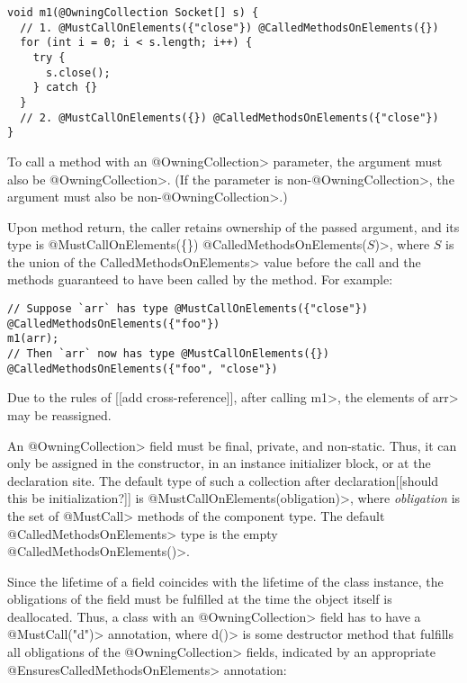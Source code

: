 \begin{verbatim}
void m1(@OwningCollection Socket[] s) {
  // 1. @MustCallOnElements({"close"}) @CalledMethodsOnElements({})
  for (int i = 0; i < s.length; i++) {
    try {
      s.close();
    } catch {}
  }
  // 2. @MustCallOnElements({}) @CalledMethodsOnElements({"close"})
}
\end{verbatim}

To call a method with an \<@OwningCollection> parameter, the argument must
also be \<@OwningCollection>.
(If the parameter is non-\<@OwningCollection>, the argument must also be non-\<@OwningCollection>.)

Upon method return, the caller retains ownership of the passed argument,
and its type is
\<@MustCallOnElements(\{\}) @CalledMethodsOnElements($S$)>, where $S$ is the
union of
the \<CalledMethodsOnElements> value before the call and the methods guaranteed
to have been called by the method.  For example:

\begin{verbatim}
// Suppose `arr` has type @MustCallOnElements({"close"}) @CalledMethodsOnElements({"foo"})
m1(arr);
// Then `arr` now has type @MustCallOnElements({}) @CalledMethodsOnElements({"foo", "close"})
\end{verbatim}

Due to the rules of [[add cross-reference]], after calling \<m1>, the elements of \<arr> may be reassigned.



An \<@OwningCollection> field must be final, private, and non-static. Thus, it
can only be assigned in the constructor, in an instance initializer block, or at the declaration site.
The default type of such a collection after declaration[[should this be initialization?]] is \<@MustCallOnElements(obligation)>, where \textit{obligation} is the set of \<@MustCall> methods of the component type. The default \<@CalledMethodsOnElements> type is the empty \<@CalledMethodsOnElements({})>.

Since the lifetime of a field coincides with the lifetime of the class instance, the obligations of the field must be fulfilled at the time the object itself is deallocated.
Thus, a class with an \<@OwningCollection> field has to have a \<@MustCall("d")> annotation, where \<d()> is some destructor method that fulfills all obligations of the \<@OwningCollection> fields, indicated by an appropriate \<@EnsuresCalledMethodsOnElements> annotation:

